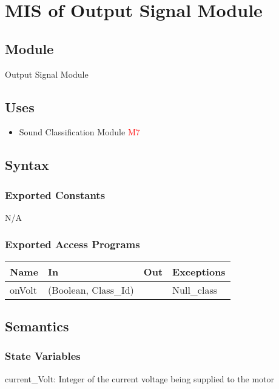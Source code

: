 \documentclass[12pt, titlepage]{article}
\begin{document}
\section{MIS of Output Signal Module} \label{Output Signal Module}
\subsection{Module}
Output Signal Module
\subsection{Uses}
\begin{itemize}
  \item Sound Classification Module \textcolor{red}{M7}
  \end{itemize}

\subsection{Syntax}

\subsubsection{Exported Constants}
N/A

\subsubsection{Exported Access Programs}

\begin{center}
\begin{tabular}{p{4cm} p{4cm} p{4cm} p{4cm}}
\hline
\textbf{Name} & \textbf{In} & \textbf{Out} & \textbf{Exceptions} \\
\hline
onVolt & (Boolean, Class\_Id) &  & Null\_class\\
\hline
\end{tabular}
\end{center}

\subsection{Semantics}

\subsubsection{State Variables}

current\_Volt: Integer of the current voltage being supplied to the motor
\end{document}
